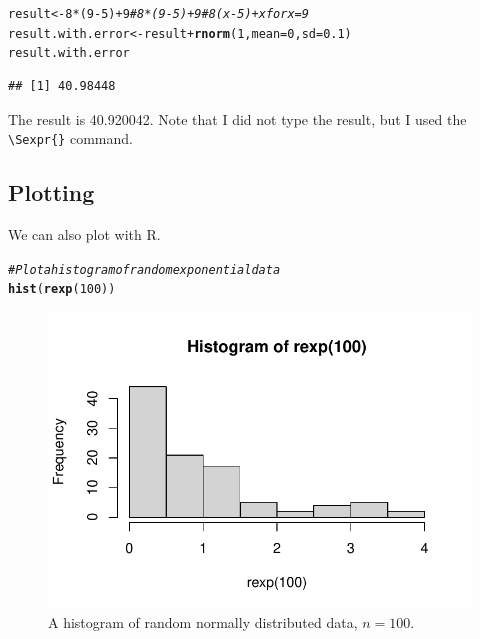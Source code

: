 \documentclass{article}\usepackage[]{graphicx}\usepackage[]{xcolor}
\makeatletter
\def\maxwidth{ %
  \ifdim\Gin@nat@width>\linewidth
    \linewidth
  \else
    \Gin@nat@width
  \fi
}
\newcommand{\hlnum}[1]{\textcolor[rgb]{0.686,0.059,0.569}{#1}}%
\newcommand{\hlcom}[1]{\textcolor[rgb]{0.678,0.584,0.686}{\textit{#1}}}%
\newcommand{\hlopt}[1]{\textcolor[rgb]{0,0,0}{#1}}%
\newcommand{\hldef}[1]{\textcolor[rgb]{0.345,0.345,0.345}{#1}}%
\newcommand{\hlkwb}[1]{\textcolor[rgb]{0.69,0.353,0.396}{#1}}%
\newcommand{\hlkwc}[1]{\textcolor[rgb]{0.333,0.667,0.333}{#1}}%
\newcommand{\hlkwd}[1]{\textcolor[rgb]{0.737,0.353,0.396}{\textbf{#1}}}%
\newenvironment{kframe}{%
 \def\at@end@of@kframe{}%
 \ifinner\ifhmode%
  \def\at@end@of@kframe{\end{minipage}}%
  \begin{minipage}{\columnwidth}%
 \fi\fi%
 \def\FrameCommand##1{\hskip\@totalleftmargin \hskip-\fboxsep
 \colorbox{shadecolor}{##1}\hskip-\fboxsep
     \hskip-\linewidth \hskip-\@totalleftmargin \hskip\columnwidth}%
 \MakeFramed {\advance\hsize-\width
   \@totalleftmargin\z@ \linewidth\hsize
   \@setminipage}}%
 {\par\unskip\endMakeFramed%
 \at@end@of@kframe}
\newenvironment{knitrout}{}{} %
\makeatother
\begin{document}
\begin{multicols}{2}
\begin{knitrout}
\color{fgcolor}\begin{kframe}
\begin{alltt}
\hldef{result} \hlkwb{<-} \hlnum{8}\hlopt{*}\hldef{(}\hlnum{9}\hlopt{-}\hlnum{5}\hldef{)} \hlopt{+} \hlnum{9}  \hlcom{# 8*(9-5) + 9 # 8(x-5) + x for x = 9}
\hldef{result.with.error} \hlkwb{<-} \hldef{result} \hlopt{+} \hlkwd{rnorm}\hldef{(}\hlnum{1}\hldef{,} \hlkwc{mean} \hldef{=} \hlnum{0}\hldef{,} \hlkwc{sd} \hldef{=} \hlnum{0.1}\hldef{)}
\hldef{result.with.error}
\end{alltt}
\begin{verbatim}
## [1] 40.98448
\end{verbatim}
\end{kframe}
\end{knitrout}
\indent The result is 40.920042. Note that I did not type the result, but I used the \verb|\Sexpr{}| command.
\subsection{Plotting}
We can also plot with R.
\begin{knitrout}\scriptsize
{}\color{fgcolor}\begin{kframe}
\begin{alltt}
\hlcom{#Plot a histogram of random exponential data}
\hlkwd{hist}\hldef{(}\hlkwd{rexp}\hldef{(}\hlnum{100}\hldef{))}
\end{alltt}
\end{kframe}
\end{knitrout}
\begin{figure}[H]
\begin{center}
\begin{knitrout}
\color{fgcolor}
\includegraphics[width=\maxwidth]{figure/unnamed-chunk-6-1} 
\end{knitrout}
\caption{A histogram of random normally distributed data, $n=100$.}
\label{plot1} %
\end{center}
\end{figure}

\end{multicols}
\end{document}
